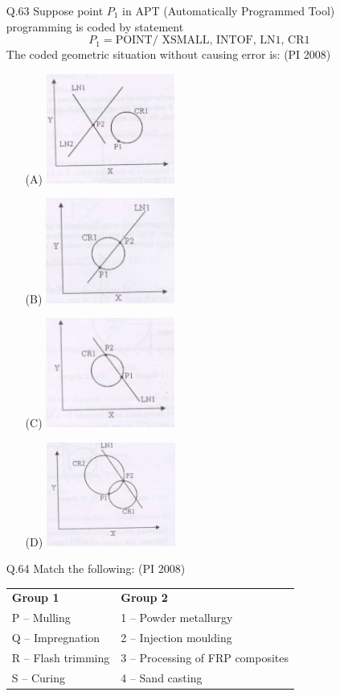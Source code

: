 \documentclass[journal,12pt,onecolumn]{IEEEtran}
\theoremstyle{remark}
\begin{document}
\begin{enumerate}
\item[\textnormal{Q.63}] 
Suppose point $P_1$ in APT (Automatically Programmed Tool) programming is coded by statement  
\[
P_1 = \text{POINT/ XSMALL, INTOF, LN1, CR1}
\]  
The coded geometric situation without causing error is:
\hfill{(PI 2008)}
\begin{itemize}
    \item[(A)] \includegraphics[width=0.35\textwidth]{figures/63-a-pi-2008-gate.png}
    \item[(B)] \includegraphics[width=0.35\textwidth]{figures/63-b-pi-2008-gate.png}
    \item[(C)] \includegraphics[width=0.35\textwidth]{figures/63-c-pi-2008-gate.png}
    \item[(D)] \includegraphics[width=0.35\textwidth]{figures/63-d-pi-2008-gate.png}
\end{itemize}

\vspace{0.5cm}
\item[\textnormal{Q.64}] 
Match the following:
\hfill{(PI 2008)}\\
\begin{tabular}{ll}
\textbf{Group 1} & \textbf{Group 2} \\
P -- Mulling & 1 -- Powder metallurgy \\
Q -- Impregnation & 2 -- Injection moulding \\
R -- Flash trimming & 3 -- Processing of FRP composites \\
S -- Curing & 4 -- Sand casting \\
\end{tabular}


\end{enumerate}
\end{document}
